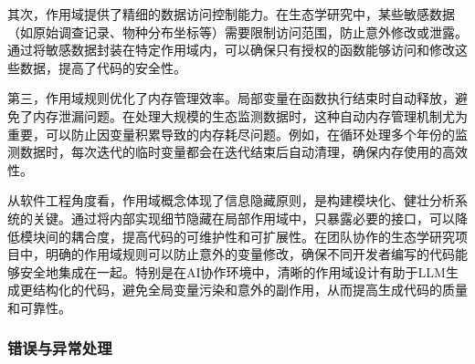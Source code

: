 \documentclass[
  twoside]{book}
\begin{document}
其次，作用域提供了精细的数据访问控制能力。在生态学研究中，某些敏感数据（如原始调查记录、物种分布坐标等）需要限制访问范围，防止意外修改或泄露。通过将敏感数据封装在特定作用域内，可以确保只有授权的函数能够访问和修改这些数据，提高了代码的安全性。

第三，作用域规则优化了内存管理效率。局部变量在函数执行结束时自动释放，避免了内存泄漏问题。在处理大规模的生态监测数据时，这种自动内存管理机制尤为重要，可以防止因变量积累导致的内存耗尽问题。例如，在循环处理多个年份的监测数据时，每次迭代的临时变量都会在迭代结束后自动清理，确保内存使用的高效性。

从软件工程角度看，作用域概念体现了信息隐藏原则，是构建模块化、健壮分析系统的关键。通过将内部实现细节隐藏在局部作用域中，只暴露必要的接口，可以降低模块间的耦合度，提高代码的可维护性和可扩展性。在团队协作的生态学研究项目中，明确的作用域规则可以防止意外的变量修改，确保不同开发者编写的代码能够安全地集成在一起。特别是在AI协作环境中，清晰的作用域设计有助于LLM生成更结构化的代码，避免全局变量污染和意外的副作用，从而提高生成代码的质量和可靠性。

\hypertarget{ux9519ux8befux4e0eux5f02ux5e38ux5904ux7406}{%
\subsubsection{错误与异常处理}\label{ux9519ux8befux4e0eux5f02ux5e38ux5904ux7406}}
\end{document}
